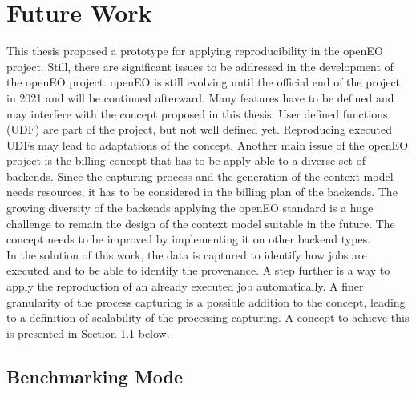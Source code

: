 \documentclass[draft,final]{vutinfth} %
\begin{document}
\section{Future Work}\label{FutureWork}
This thesis proposed a prototype for applying reproducibility in the openEO project. Still, there are significant issues to be addressed in the development of the openEO project. 
openEO is still evolving until the official end of the project in 2021 and will be continued afterward. Many features have to be defined and may interfere with the concept proposed in this thesis. User defined functions (UDF) are part of the project, but not well defined yet. Reproducing executed UDFs may lead to adaptations of the concept. Another main issue of the openEO project is the billing concept that has to be apply-able to a diverse set of backends. Since the capturing process and the generation of the context model needs resources, it has to be considered in the billing plan of the backends. The growing diversity of the backends applying the openEO standard is a huge challenge to remain the design of the context model suitable in the future. The concept needs to be improved by implementing it on other backend types. \\
In the solution of this work, the data is captured to identify how jobs are executed and to be able to identify the provenance. A step further is a way to apply the reproduction of an already executed job automatically. A finer granularity of the process capturing is a possible addition to the concept, leading to a definition of scalability of the processing capturing. A concept to achieve this is presented in Section \ref{Job:Benchmarking} below.

\subsection{Benchmarking Mode}\label{Job:Benchmarking}
\end{document}
